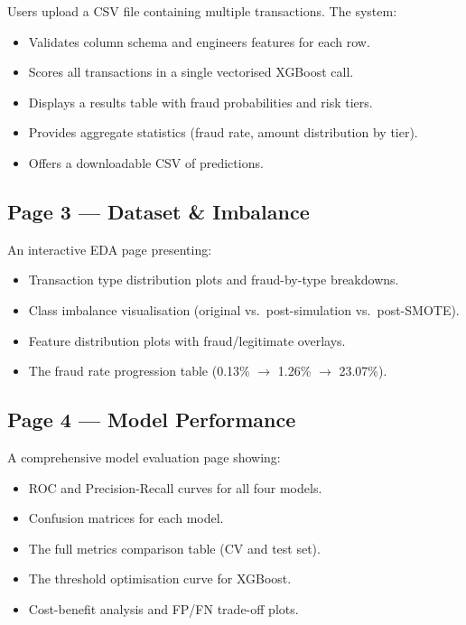 \documentclass[12pt,a4paper]{article}
\begin{document}
Users upload a CSV file containing multiple transactions. The system:
\begin{itemize}[noitemsep]
  \item Validates column schema and engineers features for each row.
  \item Scores all transactions in a single vectorised XGBoost call.
  \item Displays a results table with fraud probabilities and risk tiers.
  \item Provides aggregate statistics (fraud rate, amount distribution by tier).
  \item Offers a downloadable CSV of predictions.
\end{itemize}

\subsection{Page 3 --- Dataset \& Imbalance}

An interactive EDA page presenting:
\begin{itemize}[noitemsep]
  \item Transaction type distribution plots and fraud-by-type breakdowns.
  \item Class imbalance visualisation (original vs.\ post-simulation vs.\ post-SMOTE).
  \item Feature distribution plots with fraud/legitimate overlays.
  \item The fraud rate progression table (0.13\% $\to$ 1.26\% $\to$ 23.07\%).
\end{itemize}

\subsection{Page 4 --- Model Performance}

A comprehensive model evaluation page showing:
\begin{itemize}[noitemsep]
  \item ROC and Precision-Recall curves for all four models.
  \item Confusion matrices for each model.
  \item The full metrics comparison table (CV and test set).
  \item The threshold optimisation curve for XGBoost.
  \item Cost-benefit analysis and FP/FN trade-off plots.
\end{itemize}
\end{document}
